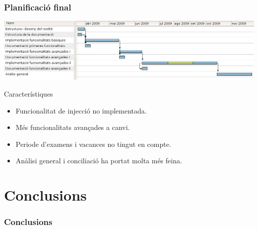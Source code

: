 \documentclass{beamer}
\begin{document}
\begin{frame}
	\frametitle{Planificació final}
	\hspace*{-0.38in}
	\includegraphics[scale=0.35,keepaspectratio]{gantt2.png} 
	\begin{block}{Característiques}
		\begin{itemize}
			\item Funcionalitat de injecció no implementada.
			\item Més funcionalitats avançades a canvi.
			\item Periode d'examens i vacances no tingut en compte.
			\item Anàlisi general i conciliació ha portat molta més feina.
		\end{itemize}
	\end{block}
\end{frame}
\section{Conclusions}
\begin{frame}
	\frametitle{Conclusions}
\end{frame}
\end{document}
